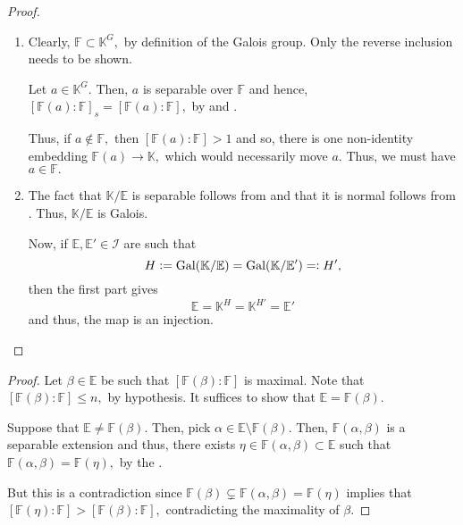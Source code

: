 \fixfieldinjectiveIG*\label{thm:fixfieldinjectiveIG2}
\begin{flushright}\hyperref[thm:fixfieldinjectiveIG]{\upsym}\end{flushright}
\begin{proof}
    \phantom{hi}
    \begin{enumerate}[leftmargin=*]
        \item Clearly, $\mathbb{F} \subset \mathbb{K}^G,$ by definition of the Galois group. Only the reverse inclusion needs to be shown.

        Let $a \in \mathbb{K}^G.$ Then, $a$ is separable over $\mathbb{F}$ and hence, $[\mathbb{F}(a) : \mathbb{F}]_s = [\mathbb{F}(a) : \mathbb{F}],$ by  and .

        Thus, if $a \notin \mathbb{F},$ then $[\mathbb{F}(a) : \mathbb{F}] > 1$ and so, there is one non-identity embedding $\mathbb{F}(a) \to \mathbb{K},$ which would necessarily move $a.$ Thus, we must have $a \in \mathbb{F}.$
        \item The fact that $\mathbb{K}/\mathbb{E}$ is separable follows from  and that it is normal follows from . Thus, $\mathbb{K}/\mathbb{E}$ is Galois.

        Now, if $\mathbb{E}, \mathbb{E}' \in \mathcal{I}$ are such that 
        \begin{equation*} 
            H \vcentcolon= \operatorname{Gal}(\mathbb{K}/\mathbb{E}) = \operatorname{Gal}(\mathbb{K}/\mathbb{E}') =\vcentcolon H',
        \end{equation*}
        then the first part gives
        \begin{equation*} 
            \mathbb{E} = \mathbb{K}^H = \mathbb{K}^{H'} = \mathbb{E}'
        \end{equation*}
        and thus, the map is an injection. \qedhere
    \end{enumerate}
\end{proof}

\degboundedbyn*\label{lem:degboundedbyn2}
\begin{flushright}\hyperref[lem:degboundedbyn]{\upsym}\end{flushright}
\begin{proof}
    Let $\beta \in \mathbb{E}$ be such that $[\mathbb{F}(\beta) : \mathbb{F}]$ is maximal. Note that $[\mathbb{F}(\beta) : \mathbb{F}] \le n,$ by hypothesis. It suffices to show that $\mathbb{E} = \mathbb{F}(\beta).$

    Suppose that $\mathbb{E} \neq \mathbb{F}(\beta).$ Then, pick $\alpha \in \mathbb{E} \setminus \mathbb{F}(\beta).$ Then, $\mathbb{F}(\alpha, \beta)$ is a separable extension and thus, there exists $\eta \in \mathbb{F}(\alpha, \beta) \subset \mathbb{E}$ such that $\mathbb{F}(\alpha, \beta) = \mathbb{F}(\eta),$ by the .

    But this is a contradiction since $\mathbb{F}(\beta) \subsetneq \mathbb{F}(\alpha, \beta) = \mathbb{F}(\eta)$ implies that $[\mathbb{F}(\eta) : \mathbb{F}] > [\mathbb{F}(\beta) : \mathbb{F}],$ contradicting the maximality of $\beta.$
\end{proof}

